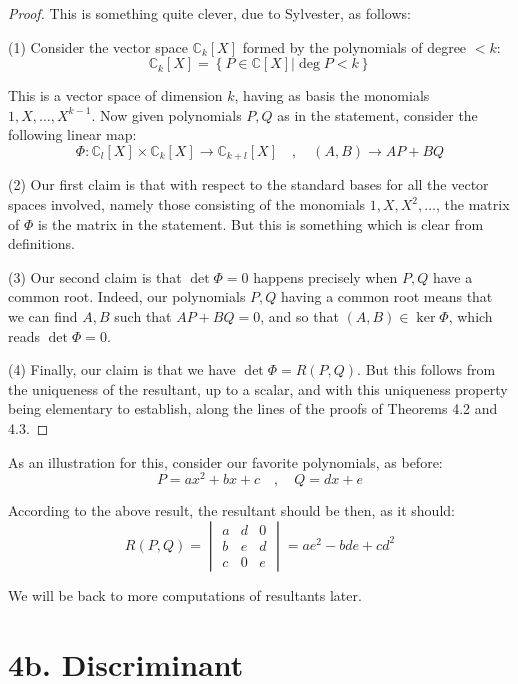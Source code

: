 \documentclass[12pt]{amsbook}
\begin{document}
\begin{proof}
This is something quite clever, due to Sylvester, as follows:

\medskip

(1) Consider the vector space $\mathbb C_k[X]$ formed by the polynomials of degree $<k$:
$$\mathbb C_k[X]=\left\{P\in\mathbb C[X]\Big|\deg P<k\right\}$$

This is a vector space of dimension $k$, having as basis the monomials $1,X,\ldots,X^{k-1}$. Now given polynomials $P,Q$ as in the statement, consider the following linear map:
$$\Phi:\mathbb C_l[X]\times\mathbb C_k[X]\to\mathbb C_{k+l}[X]\quad,\quad (A,B)\to AP+BQ$$

\medskip

(2) Our first claim is that with respect to the standard bases for all the vector spaces involved, namely those consisting of the monomials $1,X,X^2,\ldots$, the matrix of $\Phi$ is the matrix in the statement. But this is something which is clear from definitions.

\medskip

(3) Our second claim is that $\det\Phi=0$ happens precisely when $P,Q$ have a common root. Indeed, our polynomials $P,Q$ having a common root means that we can find $A,B$ such that $AP+BQ=0$, and so that $(A,B)\in\ker\Phi$, which reads $\det\Phi=0$.

\medskip

(4) Finally, our claim is that we have $\det\Phi=R(P,Q)$. But this follows from the uniqueness of the resultant, up to a scalar, and with this uniqueness property being elementary to establish, along the lines of the proofs of Theorems 4.2 and 4.3.
\end{proof}

As an illustration for this, consider our favorite polynomials, as before:
$$P=ax^2+bx+c\quad,\quad 
Q=dx+e$$

According to the above result, the resultant should be then, as it should:
$$R(P,Q)
=\begin{vmatrix}
a&d&0\\
b&e&d\\
c&0&e
\end{vmatrix}
=ae^2-bde+cd^2$$

We will be back to more computations of resultants later.

\section*{4b. Discriminant}
\end{document}
